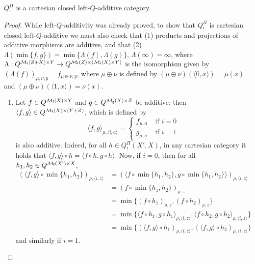 \begin{proposition}
$Q^{\Pi}_{!}$ is a cartesian closed left-$Q$-additive category.
\end{proposition}
\begin{proof} While left-$Q$-additivity was already proved, to show that $Q^{\Pi}_{!}$ is cartesian closed left-$Q$-additive we must also check that (1) products and projections of additive morphisms are additive, and that (2) $\Lambda(\min\{f,g\})=\min\{\Lambda(f),\Lambda(g)\}$, $\Lambda(\infty)=\infty$, where $\Lambda:Q^{\mathcal{M}_{\mathsf f}(Z+X)\times Y}\to Q^{\mathcal{M}_{\mathsf f}(Z)\times( \mathcal{M}_{\mathsf f}(X)\times Y)}$ is the isomorphism given by
$(\Lambda(f))_{\mu,\nu,y}= f_{\mu\oplus\nu,y}$, where 
 $\mu\oplus\nu$ is defined by $(\mu\oplus\nu)(\langle 0,x\rangle)=\mu(x)$ and $(\mu\oplus \nu)(\langle 1,x\rangle)=\nu(x)$.
	\begin{enumerate}
	\item  Let $f\in Q^{\mathcal{M}_{\mathsf f}(X)\times Y}$ and $g\in Q^{\mathcal{M}_{\mathsf g}(X)\times Z}$ be additive; then $\langle f,g\rangle \in Q^{\mathcal{M}_{\mathsf f}(X)\times (Y+Z)}$, which is defined by 
	$$
	\langle f,g\rangle_{\mu,\langle i,a\rangle}= \begin{cases}
	f_{\mu,a} & \text{ if }i=0\\
	g_{\mu,a} & \text{ if }i=1
	\end{cases}
	$$
	is also additive. Indeed, for all $h\in Q^{\Pi}_{!}(X',X)$, 
	in any cartesian category it holds that $\langle f,g\rangle \circ h=\langle f\circ h, g\circ h\rangle$. Now, 
		if $i=0$, then for all $h_{1},h_{2}\in Q^{\mathcal{M}_{\mathsf f}(X')\times X}$, 
	\begin{align*}
	(\langle f,g\rangle\circ \min\{h_{1},h_{2}\})_{\rho,\langle i,z\rangle}&=
	(\langle f\circ  \min\{h_{1},h_{2}\},g\circ  \min\{h_{1},h_{2}\}\rangle)_{\rho,\langle i,z\rangle} 
	\\
&=	(f\circ \min\{h_{1},h_{2}\})_{\rho, z}\\ &
	= \min\{(f\circ h_{1})_{\rho,z},(f\circ h_{2})_{\rho,z}\} \\
	&=
	\min\{ \langle f\circ h_{1},g\circ h_{1}\rangle_{\rho,\langle i,z\rangle}, 
	\langle f\circ h_{2},g\circ h_{2}\rangle_{\rho,\langle i,z\rangle}
\}
	\\
	& = \min\{ (\langle f,g\rangle\circ h_{1})_{\rho,\langle i,z\rangle},(\langle f,g\rangle\circ h_{2})_{\rho,\langle i,z\rangle}\}	\end{align*}
	and similarly if $i=1$.
	

\end{enumerate}
\end{proof}

